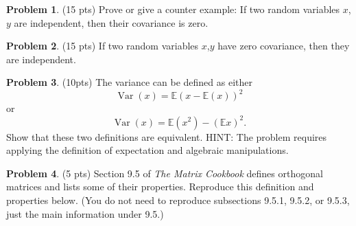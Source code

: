 \documentclass[10pt]{article}
\theoremstyle{definition}
\newtheorem{problem}{Problem}
\newcommand{\E}{\mathbb E}
\DeclareMathOperator{\Var}{Var}
\begin{document}

\newpage
\begin{problem}
    (15 pts)
    Prove or give a counter example:
    If two random variables $x$,$y$ are independent, then their covariance is zero.
\end{problem}

\newpage
\begin{problem}
    (15 pts)
    If two random variables $x$,$y$ have zero covariance, then they are independent.
\end{problem}

\newpage
\begin{problem}
    (10pts)
    The variance can be defined as either
    \begin{equation}
        \Var(x) = \E(x - \E(x))^2
    \end{equation}
    or 
    \begin{equation}
        \Var(x) = \E (x^2) - (\E x)^2
        .
    \end{equation}
    Show that these two definitions are equivalent.
    HINT:
    The problem requires applying the definition of expectation and algebraic manipulations.
\end{problem}

\newpage
\begin{problem}
    (5 pts)
    Section 9.5 of \emph{The Matrix Cookbook} defines orthogonal matrices and lists some of their properties.
    Reproduce this definition and properties below.
    (You do not need to reproduce subsections 9.5.1, 9.5.2, or 9.5.3, just the main information under 9.5.)
\end{problem}
\end{document}
